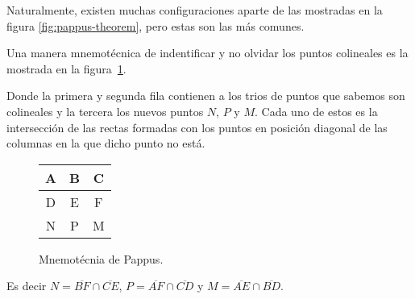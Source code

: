 \begin{multicols}{2}
    Naturalmente, existen muchas configuraciones aparte de las mostradas en la figura \ref{fig:pappus-theorem}, pero estas son las más comunes.

    Una manera mnemotécnica de indentificar y no olvidar los puntos colineales es la mostrada en la figura~\ref{fig:pappus-mnemonic}.

    Donde la primera y segunda fila contienen a los trios de puntos que sabemos son colineales y la tercera los nuevos puntos $N$, $P$ y $M$.
    Cada uno de estos es la intersección de las rectas formadas con los puntos en posición diagonal de las columnas en la que dicho punto no está.
    \begin{figure}[H]
        \centering
        \begin{tabular}{|c|c|c|}
            \hline
            A & B & C\\\hline
            D & E & F\\
            \hline \hline
            N & P & M\\
            \hline
        \end{tabular}
        \caption{Mnemotécnia de Pappus.}
        \label{fig:pappus-mnemonic}
    \end{figure}
    \vspace{-4mm}
    Es decir $N = \overline{BF} \cap \overline{CE}$, $P = \overline{AF} \cap \overline{CD}$ y $M = \overline{AE} \cap \overline{BD}$.
\end{multicols}

